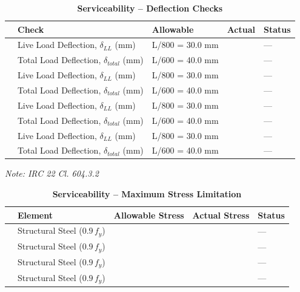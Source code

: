 \documentclass[12pt,a4paper]{report}
\numberwithin{table}{chapter}
\numberwithin{figure}{chapter}
\begin{document}
\vspace{1em}
\begin{longtable}{|C{2.5cm}|L{3.5cm}|C{3.5cm}|>{\centering\arraybackslash}p{3.5cm}|C{2.5cm}|}
\caption{\textbf{Serviceability -- Deflection Checks}}\\
\hline
\textbf{} & \textbf{Check} & \textbf{Allowable} & \textbf{Actual} & \textbf{Status} \\[6pt]
\hline
{} & Live Load Deflection, $\delta_{LL}$ (mm) & L/800 = 30.0 mm &  & --- \\[6pt]
 & Total Load Deflection, $\delta_{total}$ (mm) & L/600 = 40.0 mm &  & --- \\[6pt]
\hline
{} & Live Load Deflection, $\delta_{LL}$ (mm) & L/800 = 30.0 mm &  & --- \\[6pt]
 & Total Load Deflection, $\delta_{total}$ (mm) & L/600 = 40.0 mm &  & --- \\[6pt]
\hline
{} & Live Load Deflection, $\delta_{LL}$ (mm) & L/800 = 30.0 mm &  & --- \\[6pt]
 & Total Load Deflection, $\delta_{total}$ (mm) & L/600 = 40.0 mm &  & --- \\[6pt]
\hline
{} & Live Load Deflection, $\delta_{LL}$ (mm) & L/800 = 30.0 mm &  & --- \\[6pt]
 & Total Load Deflection, $\delta_{total}$ (mm) & L/600 = 40.0 mm &  & --- \\[6pt]
\hline
\end{longtable}
\noindent\textit{Note: IRC 22 Cl. 604.3.2}

\vspace{1em}
\begin{longtable}{|C{2.5cm}|L{3.5cm}|C{3.5cm}|>{\centering\arraybackslash}p{3.5cm}|C{2.5cm}|}
\caption{\textbf{Serviceability -- Maximum Stress Limitation}}\\
\hline
\textbf{} & \textbf{Element} & \textbf{Allowable Stress} & \textbf{Actual Stress} & \textbf{Status} \\[6pt]
\hline
{} & Structural Steel ($0.9\,f_y$) &  &  & --- \\[6pt]
\hline
{} & Structural Steel ($0.9\,f_y$) &  &  & --- \\[6pt]
\hline
{} & Structural Steel ($0.9\,f_y$) &  &  & --- \\[6pt]
\hline
{} & Structural Steel ($0.9\,f_y$) &  &  & --- \\[6pt]
\hline
\end{longtable}
\end{document}
